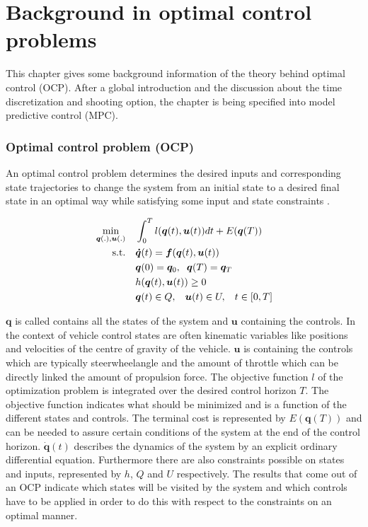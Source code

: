 \chapter{Background in optimal control problems\\}
\label{cha:OCP}

This chapter gives some background information of the theory behind optimal control (OCP). After a global introduction and the discussion about the time discretization and shooting option, the chapter is being specified into model predictive control (MPC).\\

\subsection{Optimal control problem (OCP)}
An optimal control problem determines the desired inputs and corresponding state trajectories to change the system from an initial state to a desired final state in an optimal way while satisfying some input and state constraints \cite{Mercy2018}.

\begin{equation}
\label{eq:OCP}
\begin{aligned}
\min_{\bm{q}(.),\bm{u}(.)} \quad & \int_{0}^{T}l(\bm{q}(t),\bm{u}(t))dt + E(\bm{q}(T)) \\
\textrm{s.t.} \quad & \bm{\dot{q}}(t) = \bm{f}(\bm{q}(t), \bm{u}(t))\\
& \bm{q}(0)= \bm{q}_{0},\hspace{2 mm}\bm{q}(T)= \bm{q}_{T}    \\
& h(\bm{q}(t),\bm{u}(t)) \geq 0	\\
& \bm{q}(t)\in Q,\hspace{3 mm} \bm{u}(t)\in U, \hspace{3 mm} t\in [0, T]
\end{aligned}
\end{equation}

$\bm{q}$ is called contains all the states of the system and $\bm{u}$ containing the controls. In the context of vehicle control states are often kinematic variables like positions and velocities of the centre of gravity of the vehicle. $\bm{u}$ is containing the controls which are typically steerwheelangle and the amount of throttle which can be directly linked the amount of propulsion force. The objective function $l$ of the optimization problem is integrated over the desired control horizon $T$. The objective function indicates what should be minimized and is a function of the different states and controls. The terminal cost is represented by $E(\bm{q}(T))$ and can be needed to assure certain conditions of the system at the end of the control horizon. $\bm{\dot{q}}(t)$ describes the dynamics of the system by an explicit ordinary differential equation. Furthermore there are also constraints possible on states and inputs, represented by $h$, $Q$ and $U$ respectively. The results that come out of an OCP indicate which states will be visited by the system and which controls have to be applied in order to do this with respect to the constraints on an optimal manner. \cite{Patrinos2019}\\ 

